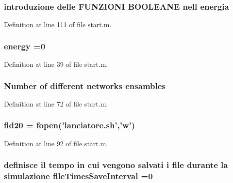 \hypertarget{a00071_a15a0e3f3007df072a07460518322b944}{
\subsubsection[{energia}]{\setlength{\rightskip}{0pt plus 5cm}introduzione delle F\-U\-N\-Z\-I\-O\-N\-I B\-O\-O\-L\-E\-A\-N\-E nell energia}}\label{a00071_a15a0e3f3007df072a07460518322b944}


Definition at line 111 of file start.\-m.

\hypertarget{a00071_ac002779c383d2cc783e881f94449de66}{
\subsubsection[{energy}]{\setlength{\rightskip}{0pt plus 5cm}energy =0}}\label{a00071_ac002779c383d2cc783e881f94449de66}


Definition at line 39 of file start.\-m.

\hypertarget{a00071_a450b0c257ca2430779e4244700c076e7}{
\subsubsection[{ensambles}]{\setlength{\rightskip}{0pt plus 5cm}Number of different networks ensambles}}\label{a00071_a450b0c257ca2430779e4244700c076e7}


Definition at line 72 of file start.\-m.

\hypertarget{a00071_aaad88534fbf3d065202db78a891374ca}{
\subsubsection[{fid20}]{ fid20 = fopen('lanciatore.\-sh','w')}}\label{a00071_aaad88534fbf3d065202db78a891374ca}


Definition at line 92 of file start.\-m.

\hypertarget{a00071_a825ee95e200498001c9f82b9637c1ff5}{
\subsubsection[{file\-Times\-Save\-Interval}]{\setlength{\rightskip}{0pt plus 5cm}definisce il tempo in cui vengono salvati {\bf i} {\bf file} durante la {\bf simulazione} file\-Times\-Save\-Interval =0}}\label{a00071_a825ee95e200498001c9f82b9637c1ff5}


